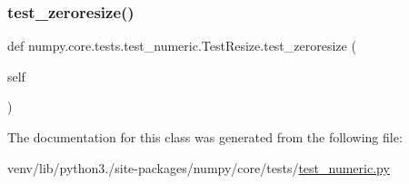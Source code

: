 \subsubsection{\texorpdfstring{test\+\_\+zeroresize()}{test\_zeroresize()}}
{\footnotesize\ttfamily def numpy.\+core.\+tests.\+test\+\_\+numeric.\+Test\+Resize.\+test\+\_\+zeroresize (\begin{DoxyParamCaption}\item[{}]{self }\end{DoxyParamCaption})}



The documentation for this class was generated from the following file\+:\begin{DoxyCompactItemize}
\item 
venv/lib/python3./site-\/packages/numpy/core/tests/\hyperlink{core_2tests_2test__numeric_8py}{test\+\_\+numeric.\+py}\end{DoxyCompactItemize}
